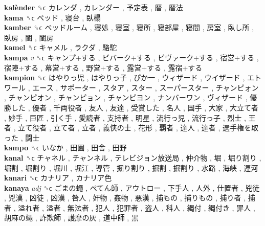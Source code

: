 \textbf{kalènder} ␝ϲ   カレンダ ,  カレンダー ,  予定表 ,  暦 ,  暦法   \\
\textbf{kama} ␝ϲ   ベッド ,  寝台 ,  臥榻   \\
\textbf{kamber} ␝ϲ   ベッドルーム ,  寝処 ,  寝室 ,  寝所 ,  寝部屋 ,  寝間 ,  房室 ,  臥し所 ,  臥房 ,  閨 ,  閨房   \\
\textbf{kamel} ␝ϲ   キャメル ,  ラクダ ,  駱駝   \\
\textbf{kampa} \emph{v}  ␝ϲ   キャンプ+する ,  ビバーク+する ,  ビヴァーク+する ,  宿営+する ,  宿陣+する ,  幕営+する ,  野営+する ,  露営+する ,  露宿+する   \\
\textbf{kampion} ␝ϲ   はやりっ児 ,  はやりっ子 ,  ぴか一 ,  ウィザード ,  ウイザード ,  エトワール ,  エース ,  サポーター ,  スタア ,  スター ,  スーパースター ,  チャンピォン ,  チャンピオン ,  チャンピョン ,  チャンピヨン ,  ナンバーワン ,  ヴィザード ,  優勝した ,  優者 ,  千両役者 ,  友人 ,  友達 ,  受賞した ,  名人 ,  国手 ,  大家 ,  大立て者 ,  妙手 ,  巨匠 ,  引く手 ,  愛読者 ,  支持者 ,  明星 ,  流行っ児 ,  流行っ子 ,  烈士 ,  王者 ,  立て役者 ,  立て者 ,  立者 ,  義侠の士 ,  花形 ,  覇者 ,  達人 ,  達者 ,  選手権を取った ,  闘士   \\
\textbf{kampo} ␝ϲ   いなか ,  田園 ,  田舎 ,  田野   \\
\textbf{kanal} ␝ϲ   チャネル ,  チャンネル ,  テレビジョン放送局 ,  仲介物 ,  堀 ,  堀り割り ,  堀割 ,  堀割り ,  堀川 ,  堀江 ,  導管 ,  掘り割り ,  掘割 ,  掘割り ,  水路 ,  海峡 ,  運河   \\
\textbf{kanari} ␝ϲ   カナリア ,  カナリア色   \\
\textbf{kanaya} \emph{adj}  ␝ϲ   ごまの蠅 ,  ぺてん師 ,  アウトロー ,  下手人 ,  人外 ,  仕置者 ,  兇徒 ,  兇漢 ,  凶徒 ,  凶漢 ,  咎人 ,  奸物 ,  姦物 ,  悪漢 ,  捕もの ,  捕りもの ,  捕り者 ,  捕者 ,  溢れ者 ,  溢者 ,  無法者 ,  犯人 ,  犯罪者 ,  盗人 ,  科人 ,  縄付 ,  縄付き ,  罪人 ,  胡麻の蠅 ,  詐欺師 ,  護摩の灰 ,  道中師 ,  黒   \\
